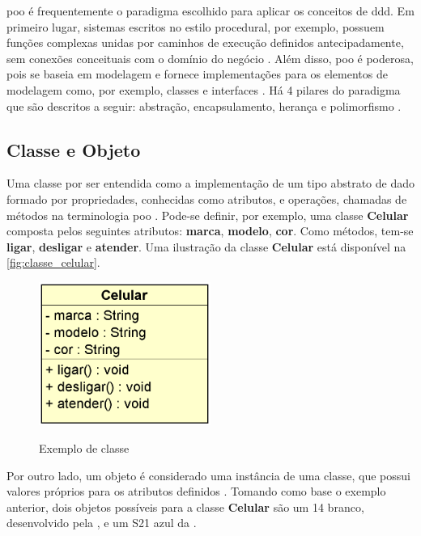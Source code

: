 \acrshort{poo} é frequentemente o paradigma escolhido para aplicar os conceitos de \acrfull{ddd}. Em primeiro lugar, sistemas escritos no estilo procedural, por exemplo, possuem funções complexas unidas por caminhos de execução definidos antecipadamente, sem conexões conceituais com o domínio do negócio \cite{evans2004ddd}. Além disso, \acrshort{poo} é poderosa, pois se baseia em modelagem e fornece implementações para os elementos de modelagem como, por exemplo, classes e interfaces \cite{evans2004ddd}. Há 4 pilares do paradigma que são descritos a seguir: abstração, encapsulamento, herança e polimorfismo \cite{booch2006}.

\subsection{Classe e Objeto}
Uma classe por ser entendida como a implementação de um tipo abstrato de dado formado por propriedades, conhecidas como atributos, e operações, chamadas de métodos na terminologia \acrshort{poo} \cite{aragao2013java}. Pode-se definir, por exemplo, uma classe \textbf{Celular} composta pelos seguintes atributos: \textbf{marca}, \textbf{modelo}, \textbf{cor}. Como métodos, tem-se \textbf{ligar}, \textbf{desligar} e \textbf{atender}. Uma ilustração da classe \textbf{Celular} está disponível na \autoref{fig:classe_celular}.

\begin{figure}[!ht]
    \centering
    \caption{Exemplo de classe}
    \includegraphics[width=0.5\textwidth]{media/classe_celular.png}
    \label{fig:classe_celular}
\end{figure}

Por outro lado, um objeto é considerado uma instância de uma classe, que possui valores próprios para os atributos definidos \cite{aragao2013java}. Tomando como base o exemplo anterior, dois objetos possíveis para a classe \textbf{Celular} são um  14 branco, desenvolvido pela , e um  S21 azul da .

